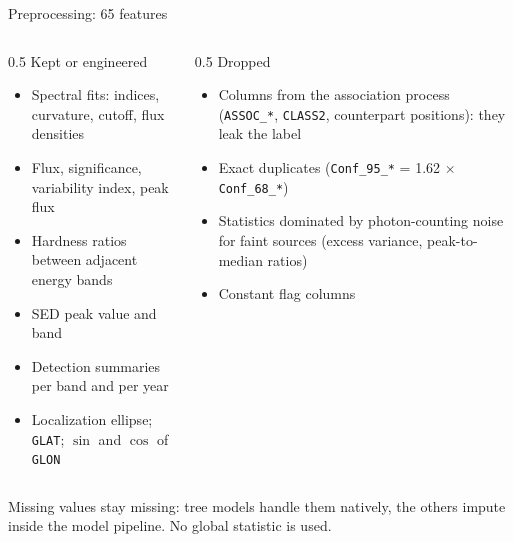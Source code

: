\documentclass[aspectratio=169, 10pt]{beamer}
\newcommand{\cls}[1]{\texttt{#1}}
\begin{document}
\begin{frame}{Preprocessing: 65 features}
  \begin{columns}[T]
    \begin{column}{0.5\textwidth}
      \small Kept or engineered
      \begin{itemize}\small
        \item Spectral fits: indices, curvature, cutoff, flux densities
        \item Flux, significance, variability index, peak flux
        \item Hardness ratios between adjacent energy bands
        \item SED peak value and band
        \item Detection summaries per band and per year
        \item Localization ellipse; \cls{GLAT}; \(\sin\) and \(\cos\) of \cls{GLON}
      \end{itemize}
    \end{column}
    \begin{column}{0.5\textwidth}
      \small Dropped
      \begin{itemize}\small
        \item Columns from the association process (\cls{ASSOC\_*}, \cls{CLASS2},
              counterpart positions): they leak the label
        \item Exact duplicates (\cls{Conf\_95\_*} = 1.62 \(\times\) \cls{Conf\_68\_*})
        \item Statistics dominated by photon-counting noise for faint sources (excess
              variance, peak-to-median ratios)
        \item Constant flag columns
      \end{itemize}
    \end{column}
  \end{columns}
  \vspace{0.3cm}
  \small Missing values stay missing: tree models handle them natively, the others impute inside
  the model pipeline. No global statistic is used.
\end{frame}
\end{document}
